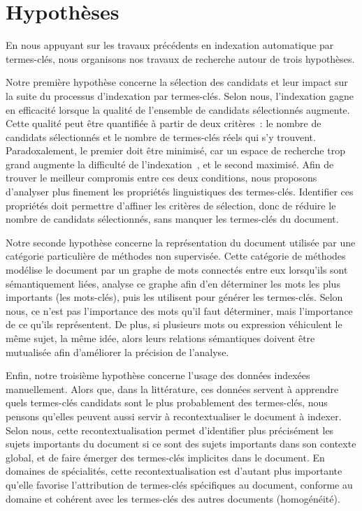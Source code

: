 
  \section{Hypothèses}
  \label{sec:main-introduction-hypothesis}
    En nous appuyant sur les travaux précédents en indexation automatique par
    termes-clés, nous organisons nos travaux de recherche autour de trois
    hypothèses.
    
    Notre première hypothèse concerne la sélection des candidats et leur impact
    sur la suite du processus d'indexation par termes-clés. Selon nous,
    l'indexation gagne en efficacité lorsque la qualité de l'ensemble de
    candidats sélectionnés augmente. Cette qualité peut être quantifiée à partir
    de deux critères~: le nombre de candidats sélectionnés et le nombre de
    termes-clés réels qui s'y trouvent. Paradoxalement, le premier doit être
    minimisé, car un espace de recherche trop grand augmente la difficulté de
    l'indexation~\cite{hasan2014state_of_the_art}, et le second maximisé. Afin
    de trouver le meilleur compromis entre ces deux conditions, nous proposons
    d'analyser plus finement les propriétés linguistiques des termes-clés.
    Identifier ces propriétés doit permettre d'affiner les critères de
    sélection, donc de réduire le nombre de candidats sélectionnés, sans manquer
    les termes-clés du document.
    
    Notre seconde hypothèse concerne la représentation du document utilisée par
    une catégorie particulière de méthodes non supervisée. Cette catégorie de
    méthodes modélise le document par un graphe de mots connectés entre eux
    lorsqu'ils sont sémantiquement liées, analyse ce graphe afin d'en déterminer
    les mots les plus importants (les mots-clés), puis les utilisent pour
    générer les termes-clés. Selon nous, ce n'est pas l'importance des mots
    qu'il faut déterminer, mais l'importance de ce qu'ils représentent. De plus,
    si plusieurs mots ou expression véhiculent le même sujet, la même idée,
    alors leurs relations sémantiques doivent être mutualisée afin d'améliorer
    la précision de l'analyse.
    
    Enfin, notre troisième hypothèse concerne l'usage des données indexées
    manuellement. Alors que, dans la littérature, ces données servent à
    apprendre quels termes-clés candidats sont le plus probablement des
    termes-clés, nous pensons qu'elles peuvent aussi servir à recontextualiser
    le document à indexer. Selon nous, cette recontextualisation permet
    d'identifier plus précisément les sujets importants du document si ce sont
    des sujets importants dans son contexte global, et de faire émerger des
    termes-clés implicites dans le document. En domaines de spécialités, cette
    recontextualisation est d'autant plus importante qu'elle favorise
    l'attribution de termes-clés spécifiques au document, conforme au domaine et
    cohérent avec les termes-clés des autres documents (homogénéité).

